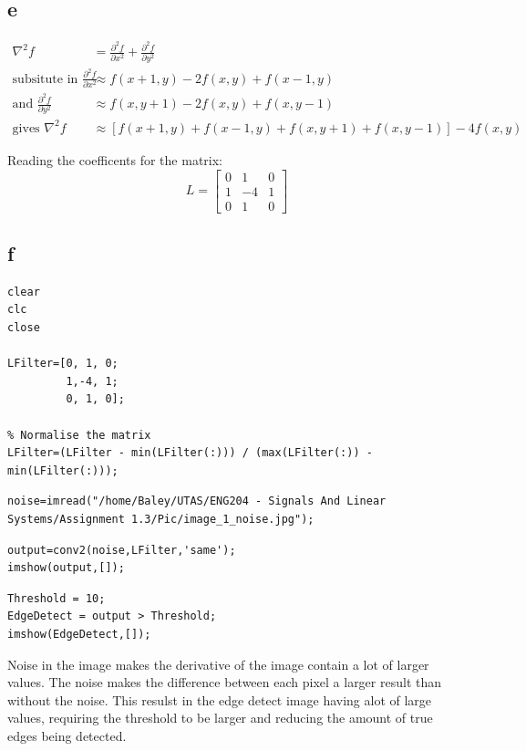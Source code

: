\documentclass[11pt]{article}
\begin{document}
\subsection{e}
\label{sec:orgca84d7d}
\begin{align*}
\nabla^{2}f &= \frac{\partial^2 f}{\partial x^2}+ \frac{\partial^2 f}{\partial y^2} \\
\textrm{subsitute in } \frac{\partial^2 f}{\partial x^2} &\approx f(x+1,y)-2f(x,y)+f(x-1,y) \\
\textrm{and } \frac{\partial^2 f}{\partial y^2} &\approx f(x,y+1)-2f(x,y)+f(x,y-1) \\
\textrm{gives }\nabla^{2}f & \approx \left[ f(x+1,y) + f(x-1,y) + f(x,y+1) + f(x,y-1)\right] - 4f(x,y)
\end{align*}

Reading the coefficents for the matrix:
\[L=\begin{bmatrix}
0 & 1  & 0 \\
1 & -4 & 1 \\
0 & 1  & 0
\end{bmatrix}\]
\subsection{f}
\label{sec:orgee10fef}
\begin{verbatim}
clear
clc
close

LFilter=[0, 1, 0;
         1,-4, 1;
         0, 1, 0];

% Normalise the matrix
LFilter=(LFilter - min(LFilter(:))) / (max(LFilter(:)) - min(LFilter(:)));
\end{verbatim}

\begin{verbatim}
noise=imread("/home/Baley/UTAS/ENG204 - Signals And Linear Systems/Assignment 1.3/Pic/image_1_noise.jpg");
\end{verbatim}

\begin{verbatim}
output=conv2(noise,LFilter,'same');
imshow(output,[]);
\end{verbatim}

\begin{verbatim}
Threshold = 10;
EdgeDetect = output > Threshold;
imshow(EdgeDetect,[]);
\end{verbatim}
Noise in the image makes the derivative of the image contain a lot of larger values. The noise makes the difference between each pixel a larger result than without the noise. This resulst in the edge detect image having alot of large values, requiring the threshold to be larger and reducing the amount of true edges being detected.
\end{document}
